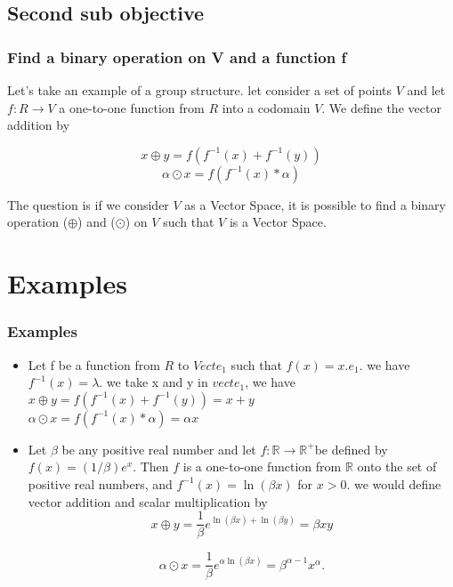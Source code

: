 \documentclass{beamer}
\begin{document}
\subsection{Second sub objective}
\begin{frame}
    \frametitle{Find a binary operation on V and a function f }
	Let's take an example of a group structure.
	let consider a set of points  $ V $ and let  $ f: R \rightarrow V $ a one-to-one
	function from $R$ into a codomain $V$. We define the vector addition by
	
    $$ x \oplus y = f(f^{-1}(x) + f^{-1}(y)) $$
    $$ \alpha \odot x = f(f^{-1}(x) * \alpha) $$

	The question is if we consider $V$ as a Vector Space, it is possible to find a binary operation ($\oplus$) and ($\odot$) on $V$ such that $V$ is a Vector Space.
	
\end{frame}



\section{Examples}
\begin{frame}
    \frametitle{Examples}
    \begin{itemize}
        \item Let f be a function from $R$ to $Vect{e_1}$ such that $f(x) = x.e_1$.
        we have $f^{-1}(x) = \lambda$.
            we take x and y in $vect{e_1}$, we have \\
            $x\oplus y = f(f^{-1}(x) + f^{-1}(y)) = x + y$ \\
            $\alpha \odot x = f(f^{-1}(x) * \alpha) = \alpha x$
            \item Let $\beta$ be any positive real number and let $f: \mathbb{R} \rightarrow \mathbb{R}^{+}$be defined by $f(x)=(1 / \beta) e^x$. Then $f$ is a one-to-one function from $\mathbb{R}$ onto the set of positive real numbers, and $f^{-1}(x)=\ln (\beta x)$ for $x>0$. we would define vector addition and scalar multiplication by
            $$
            x \oplus y=\frac{1}{\beta} e^{\ln (\beta x)+\ln (\beta y)}=\beta x y
            $$ 
            
            $$
            \alpha \odot x=\frac{1}{\beta} e^{\alpha \ln (\beta x)}=\beta^{\alpha-1} x^\alpha.
            $$ 
        \end{itemize}
    \end{frame}
\end{document}

